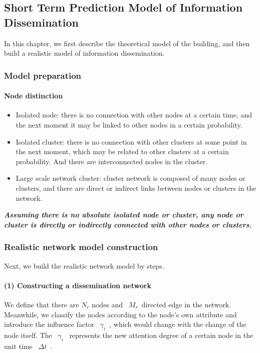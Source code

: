 \documentclass[a4paper,11pt]{article}
\begin{document}
\subsection{Short Term Prediction Model of Information Dissemination}
\par In this chapter, we first describe the theoretical model of the building, and then build a realistic model of information dissemination.
\subsubsection{Model preparation}
\paragraph{Node distinction}
\text{\\}
\begin{itemize}
\item Isolated node: there is no connection with other nodes at a certain time, and the next moment it may be linked to other nodes in a certain probability.
\item Isolated cluster: there is no connection with other clusters at some point in the next moment, which may be related to other clusters at a certain probability. And there are interconnected nodes in the cluster.
\item Large scale network cluster: cluster network is composed of many nodes or clusters, and there are direct or indirect links between nodes or clusters in the network.
\end{itemize}
\textbf{\emph{Assuming there is no absolute isolated node or cluster, any node or cluster is directly or indirectly connected with other nodes or clusters.}}



\subsubsection{Realistic network model construction}
\par Next, we build the realistic network model by steps.
\paragraph{(1) Constructing a dissemination network}
\text{\\}
\par We define that there are $N_r$ nodes and ~$M_r$~directed edge in the network. Meanwhile, we classify the nodes according to the node's own attribute and introduce the influence factor ~$\gamma _i$~, which would change with the change of the node itself. The ~$\gamma _i$~ represents the new attention degree of a certain node in the unit time ~$\Delta t$~.
\end{document}
